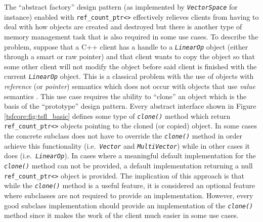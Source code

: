 The ``abstract factory'' design pattern (as implemented by
\texttt{\textit{VectorSpace}} for instance) enabled with \texttt{ref\_count\_ptr<>}
effectively relieves clients from having to deal with how objects are
created and destroyed but there is another type of memory management
task that is also required in some use cases.  To describe the
problem, suppose that a C++ client has a handle to a
\texttt{\textit{LinearOp}} object (either through a smart or raw
pointer) and that client wants to copy the object so that some other
client will not modify the object before said client is finished with
the current \texttt{\textit{LinearOp}} object.  This is a classical
problem with the use of objects with {\em reference} (or {\em
pointer}) semantics which does not occur with objects that use {\em
value} semantics \cite{ref:stroustrup_1997}.  This use case requires
the ability to ``clone'' an object which is the basis of the
``prototype'' design pattern.  Every abstract interface shown in
Figure \ref{tsfcore:fig:tsfl_basic} defines some type of
\texttt{\textit{clone()}} method which return
\texttt{ref\_count\_ptr<>} objects pointing to the cloned (or copied)
object.  In some cases the concrete subclass does not have to
override the \texttt{\textit{clone()}} method in order achieve this
functionality (i.e.~\texttt{\textit{Vector}} and
\texttt{\textit{Multi\-Vector}}) while in other cases it does
(i.e.~\texttt{\textit{LinearOp}}).  In cases
where a meaningful default implementation for the
\texttt{\textit{clone()}} method can not be provided, a default implementation
returning a null \texttt{ref\_count\_ptr<>} object is provided.
The implication of this approach is that while the \texttt{\textit{clone()}}
method is a useful feature, it is considered an optional feature where
subclasses are not required to provide an implementation.  However,
every good subclass implementation should provide an implementation of
the \texttt{\textit{clone()}} method since it makes the work of the client much
easier in some use cases.
	
